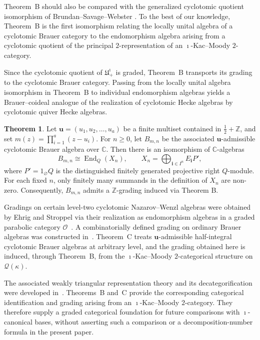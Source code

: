 \documentclass[a4,10pt]{amsart}
\numberwithin{equation}{section}
\theoremstyle{definition}
\newtheorem{THEOREM}{Theorem}
\begin{document}
Theorem~B should also be compared with the generalized cyclotomic
quotient isomorphism of Brundan--Savage--Webster
\cite[Theorem~5.19]{BSW-heisenberg}. To the best of our knowledge,
Theorem~B is the first isomorphism relating the locally unital algebra
of a cyclotomic Brauer category to the endomorphism algebra arising
from a cyclotomic quotient of the principal $2$-representation of an
$\imath$-Kac--Moody $2$-category.





Since the cyclotomic quotient of $\mathfrak  U^{\imath}_{+}$  is graded, Theorem~B transports its grading to the cyclotomic Brauer category. Passing from the locally unital algebra isomorphism in Theorem~B
to individual endomorphism algebras yields a Brauer--coideal analogue
of the realization of cyclotomic Hecke algebras by cyclotomic quiver
Hecke algebras. 

\begin{THEOREM}\label{thmc}Let $\mathbf u=(u_1, u_2, \ldots, u_a)$ be a finite multiset contained in $\frac12+\mathbb Z$, and set $m(z)=\prod_{i=1}^a (z-u_i)$. For $n\ge 0$, 
let $B_{m,n}$ be the associated  $\mathbf u$-admissible cyclotomic Brauer algebra over $\mathbb C$. Then there is an isomorphism of
$\mathbb C$-algebras
\begin{equation} \label{iso-nwalg}   B_{m,n}
   \cong
   \operatorname{End}_{ Q}(X_n),
   \qquad
   X_n=\bigoplus_{\mathbf i\in I^n}E_{\mathbf i}P',
\end{equation} where $P'=1_{\varnothing}Q$ is the distinguished finitely generated
projective right $Q$-module. For each fixed $n$, only finitely many summands in the definition of $X_n$ are non-zero. Consequently, $B_{m,n}$ admits a  $\mathbb Z$-grading   induced via
Theorem B.
\end{THEOREM}

Gradings on certain level-two cyclotomic Nazarov--Wenzl algebras
were obtained by Ehrig and Stroppel via their realization as
endomorphism algebras in a graded parabolic category
$\mathcal O$~\cite{ES16, ES18}. A combinatorially defined grading on
ordinary Brauer algebras was constructed in~\cite{Li}.
Theorem~C treats $\mathbf u$-admissible half-integral cyclotomic
Brauer algebras at arbitrary level, and the grading obtained here
is induced, through Theorem~B, from the $\imath$-Kac--Moody
$2$-categorical structure on $\mathcal Q(\kappa)$.






The associated weakly triangular representation theory and its
decategorification were developed in~\cite{GRS-tri}. Theorems~B
and~C provide the corresponding categorical identification and
grading arising from an $\imath$-Kac--Moody $2$-category.
They
therefore supply a graded categorical foundation for future
comparisons with $\imath$-canonical bases, without asserting such a
comparison or a decomposition-number formula in the present paper.
\end{document}
